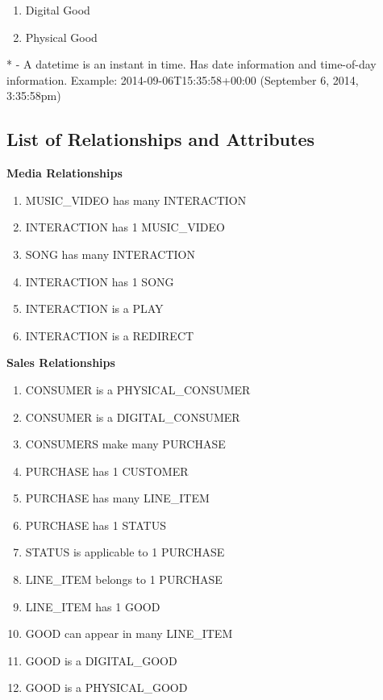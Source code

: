 \documentclass[11pt, a4paper]{report}
\begin{document}
\begin{enumerate}
\item Digital Good

\item Physical Good

\end{enumerate}

* - A datetime is an instant in time. Has date information and time-of-day information. Example: 2014-09-06T15:35:58+00:00 (September 6, 2014, 3:35:58pm)

\clearpage
\subsection{List of Relationships and Attributes}

\noindent\textbf{Media Relationships}
\begin{enumerate}
\item MUSIC\_VIDEO has many INTERACTION
\item INTERACTION has 1 MUSIC\_VIDEO
\item SONG has many INTERACTION
\item INTERACTION has 1 SONG
\item INTERACTION is a PLAY
\item INTERACTION is a REDIRECT
\end{enumerate}

\noindent\textbf{Sales Relationships}
\begin{enumerate}
\item CONSUMER is a PHYSICAL\_CONSUMER
\item CONSUMER is a DIGITAL\_CONSUMER
\item CONSUMERS make many PURCHASE
\item PURCHASE has 1 CUSTOMER
\item PURCHASE has many LINE\_ITEM
\item PURCHASE has 1 STATUS
\item STATUS is applicable to 1 PURCHASE
\item LINE\_ITEM belongs to 1 PURCHASE
\item LINE\_ITEM has 1 GOOD
\item GOOD can appear in many LINE\_ITEM
\item GOOD is a DIGITAL\_GOOD
\item GOOD is a PHYSICAL\_GOOD
\end{enumerate}
\end{document}
